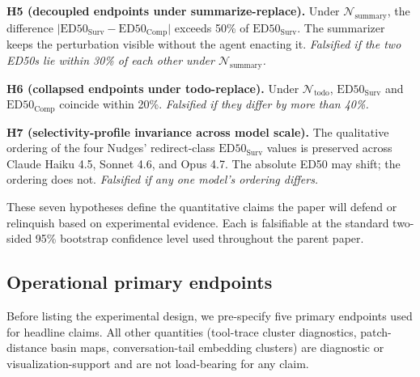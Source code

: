 \documentclass{article}
\theoremstyle{plain}
\theoremstyle{definition}
\begin{document}
\textbf{H5 (decoupled endpoints under summarize-replace).} Under $\mathcal{N}_\text{summary}$, the difference $\bigl|\text{ED50}_\text{Surv} - \text{ED50}_\text{Comp}\bigr|$ exceeds 50\% of $\text{ED50}_\text{Surv}$. The summarizer keeps the perturbation visible without the agent enacting it. \textit{Falsified if the two ED50s lie within 30\% of each other under $\mathcal{N}_\text{summary}$.}

\textbf{H6 (collapsed endpoints under todo-replace).} Under $\mathcal{N}_\text{todo}$, $\text{ED50}_\text{Surv}$ and $\text{ED50}_\text{Comp}$ coincide within 20\%. \textit{Falsified if they differ by more than 40\%.}

\textbf{H7 (selectivity-profile invariance across model scale).} The qualitative ordering of the four Nudges' redirect-class $\text{ED50}_\text{Surv}$ values is preserved across Claude Haiku 4.5, Sonnet 4.6, and Opus 4.7. The absolute ED50 may shift; the ordering does not. \textit{Falsified if any one model's ordering differs.}

These seven hypotheses define the quantitative claims the paper will defend or relinquish based on experimental evidence. Each is falsifiable at the standard two-sided 95\% bootstrap confidence level used throughout the parent paper.

\subsection{Operational primary endpoints}

Before listing the experimental design, we pre-specify five primary endpoints used for headline claims. All other quantities (tool-trace cluster diagnostics, patch-distance basin maps, conversation-tail embedding clusters) are diagnostic or visualization-support and are not load-bearing for any claim.
\end{document}
